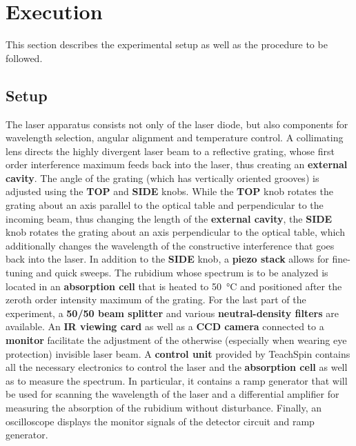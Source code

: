 \newcommand{\component}[1]{\textbf{#1}}
\newcommand{\componentlabel}[1]{\textbf{#1}}

\section{Execution}
\label{sec:durchfuehrung}
This section describes the experimental setup as well as the procedure to be followed.

\subsection{Setup}

The laser apparatus consists not only of the laser diode,
but also components for wavelength selection, angular alignment and temperature control.
A collimating lens directs the highly divergent laser beam to a reflective grating,
whose first order interference maximum feeds back into the laser,
thus creating an \component{external cavity}.
The angle of the grating (which has vertically oriented grooves)
is adjusted using the \componentlabel{TOP} and \componentlabel{SIDE} knobs.
While the \componentlabel{TOP} knob rotates the grating about an axis parallel to the optical table and perpendicular to the incoming beam,
    thus changing the length of the \component{external cavity},
the \componentlabel{SIDE} knob rotates the grating about an axis perpendicular to the optical table,
    which additionally changes the wavelength of the constructive interference that goes back into the laser.
In addition to the \componentlabel{SIDE} knob,
a \component{piezo stack} allows for fine-tuning and quick sweeps.
%
The rubidium
    whose spectrum is to be analyzed
is located in an \component{absorption cell} that is
    heated to \SI{50}{\celsius} and
    positioned after the zeroth order intensity maximum of the grating.
%
For the last part of the experiment,
a \component{50/50 beam splitter} and various \component{neutral-density filters} are available.
An \component{IR viewing card} as well as a \component{CCD camera} connected to a \component{monitor}
facilitate the adjustment of the otherwise (especially when wearing eye protection) invisible laser beam.
%
A \component{control unit} provided by TeachSpin contains all the necessary electronics
    to control the laser and the \component{absorption cell}
    as well as to measure the spectrum.
In particular,
it contains a ramp generator
    that will be used for scanning the wavelength of the laser
and a differential amplifier
    for measuring the absorption of the rubidium without disturbance. %
%
Finally, an oscilloscope displays the monitor signals of the detector circuit and ramp generator.


